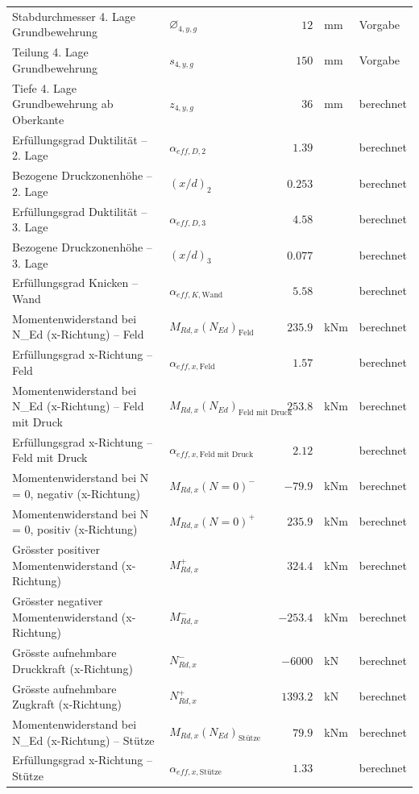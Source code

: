 \documentclass[11pt,a4paper]{article}
\begin{document}
\begin{xltabular}{\linewidth}{>{\raggedright\arraybackslash}Xlrll}
Stabdurchmesser 4. Lage Grundbewehrung & $\varnothing_{4,y,g}$ & $12$ & mm & Vorgabe \\
Teilung 4. Lage Grundbewehrung & $s_{4,y,g}$ & $150$ & mm & Vorgabe \\
Tiefe 4. Lage Grundbewehrung ab Oberkante & $z_{4,y,g}$ & $36$ & mm & berechnet \\
Erfüllungsgrad Duktilität – 2. Lage & $\alpha_{eff,D,2}$ & $1.39$ &  & berechnet \\
Bezogene Druckzonenhöhe – 2. Lage & $\left(x/d\right)_{2}$ & $0.253$ &  & berechnet \\
Erfüllungsgrad Duktilität – 3. Lage & $\alpha_{eff,D,3}$ & $4.58$ &  & berechnet \\
Bezogene Druckzonenhöhe – 3. Lage & $\left(x/d\right)_{3}$ & $0.077$ &  & berechnet \\
Erfüllungsgrad Knicken – Wand & $\alpha_{eff,K,\text{Wand}}$ & $5.58$ &  & berechnet \\
Momentenwiderstand bei N\_Ed (x-Richtung) – Feld & $M_{Rd,x}(N_{Ed})_{\text{Feld}}$ & $235.9$ & kNm & berechnet \\
Erfüllungsgrad x-Richtung – Feld & $\alpha_{eff,x,\text{Feld}}$ & $1.57$ &  & berechnet \\
Momentenwiderstand bei N\_Ed (x-Richtung) – Feld mit Druck & $M_{Rd,x}(N_{Ed})_{\text{Feld mit Druck}}$ & $253.8$ & kNm & berechnet \\
Erfüllungsgrad x-Richtung – Feld mit Druck & $\alpha_{eff,x,\text{Feld mit Druck}}$ & $2.12$ &  & berechnet \\
Momentenwiderstand bei N = 0, negativ (x-Richtung) & $M_{Rd,x}(N=0)^{-}$ & $-79.9$ & kNm & berechnet \\
Momentenwiderstand bei N = 0, positiv (x-Richtung) & $M_{Rd,x}(N=0)^{+}$ & $235.9$ & kNm & berechnet \\
Grösster positiver Momentenwiderstand (x-Richtung) & $M_{Rd,x}^{+}$ & $324.4$ & kNm & berechnet \\
Grösster negativer Momentenwiderstand (x-Richtung) & $M_{Rd,x}^{-}$ & $-253.4$ & kNm & berechnet \\
Grösste aufnehmbare Druckkraft (x-Richtung) & $N_{Rd,x}^{-}$ & $-6000$ & kN & berechnet \\
Grösste aufnehmbare Zugkraft (x-Richtung) & $N_{Rd,x}^{+}$ & $1393.2$ & kN & berechnet \\
Momentenwiderstand bei N\_Ed (x-Richtung) – Stütze & $M_{Rd,x}(N_{Ed})_{\text{Stütze}}$ & $79.9$ & kNm & berechnet \\
Erfüllungsgrad x-Richtung – Stütze & $\alpha_{eff,x,\text{Stütze}}$ & $1.33$ &  & berechnet \\

\end{xltabular}
\end{document}
